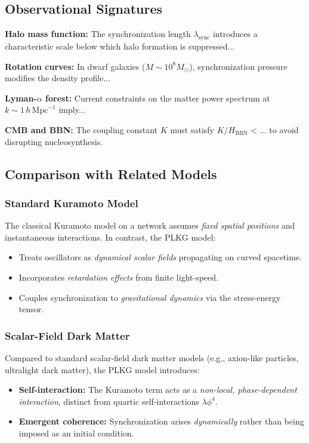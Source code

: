 \ifshowdraft
\subsection{Observational Signatures}
\label{subsec:obs_signatures}

\textbf{Halo mass function:}
The synchronization length $\lambda_{\text{sync}}$ introduces
a characteristic scale below which halo formation is suppressed...

\textbf{Rotation curves:}
In dwarf galaxies ($M \sim 10^8 M_\odot$), synchronization
pressure modifies the density profile...

\textbf{Lyman-$\alpha$ forest:}
Current constraints on the matter power spectrum at
$k \sim 1\,h\,\text{Mpc}^{-1}$ imply...

\textbf{CMB and BBN:}
The coupling constant $K$ must satisfy $K/H_{\text{BBN}} < ...$
to avoid disrupting nucleosynthesis.

\fi

\subsection{Comparison with Related Models}
\label{subsec:comparison}

\subsubsection{Standard Kuramoto Model}
The classical Kuramoto model on a network assumes \emph{fixed spatial positions} and instantaneous interactions. In contrast, the PLKG model:
\begin{itemize}
    \item Treats oscillators as \emph{dynamical scalar fields} propagating on curved spacetime.
    \item Incorporates \emph{retardation effects} from finite light-speed.
    \item Couples synchronization to \emph{gravitational dynamics} via the stress-energy tensor.
\end{itemize}

\subsubsection{Scalar-Field Dark Matter}
Compared to standard scalar-field dark matter models (e.g., axion-like particles, ultralight dark matter), the PLKG model introduces:
\begin{itemize}
    \item \textbf{Self-interaction:} The Kuramoto term acts as a \emph{non-local, phase-dependent interaction}, distinct from quartic self-interactions $\lambda \phi^4$.
    \item \textbf{Emergent coherence:} Synchronization arises \emph{dynamically} rather than being imposed as an initial condition.
\end{itemize}

